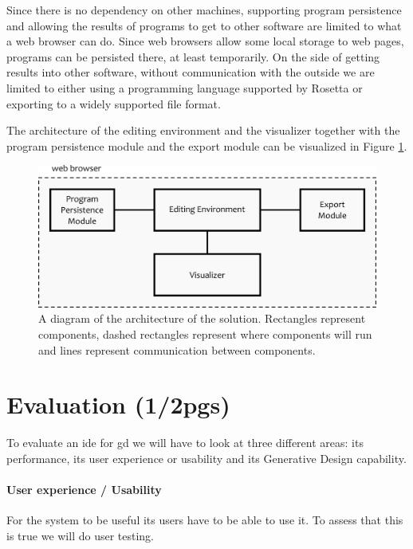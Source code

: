 \documentclass{./llncs2e/llncs}
\begin{document}
	Since there is no dependency on other machines, supporting program persistence and allowing the results of programs to get to other software are limited to what a web browser can do.
	Since web browsers allow some local storage to web pages, programs can be persisted there, at least temporarily.
	On the side of getting results into other software, without communication with the outside we are limited to either using a programming language supported by Rosetta or exporting to a widely supported file format.
	
	The architecture of the editing environment and the visualizer together with the program persistence module and the export module can be visualized in Figure \ref{fig:gen:sol}.
	
	\begin{figure}
		\centering
		\includegraphics[width=1.0\textwidth]{img/gen_sol}
		\caption{A diagram of the architecture of the solution. Rectangles represent components, dashed rectangles represent where components will run and lines represent communication between components.}
		\label{fig:gen:sol}
	\end{figure}	

\section{Evaluation (1/2pgs)}
	To evaluate an \ac{ide} for \ac{gd} we will have to look at three different areas:
	its performance, its user experience or usability and its Generative Design capability.
	
	\paragraph{User experience / Usability}
	For the system to be useful its users have to be able to use it.
	To assess that this is true we will do user testing.
	
\end{document}
